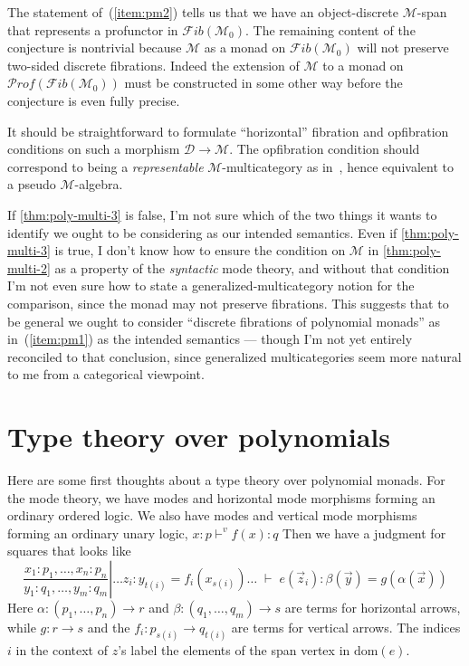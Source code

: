 \documentclass{article}
\theoremstyle{definition}
\def\M{\mathcal{M}}
\def\Fib{\mathcal{F}\mathit{ib}}
\def\Prof{\mathcal{P}\mathit{rof}}
\def\D{\mathcal{D}}
\def\dom{\mathrm{dom}}
\begin{document}
The statement of~(\ref{item:pm2}) tells us that we have an object-discrete $\M$-span that represents a profunctor in $\Fib(\M_0)$.
The remaining content of the conjecture is nontrivial because $\M$ as a monad on $\Fib(\M_0)$ will not preserve two-sided discrete fibrations.
Indeed the extension of $\M$ to a monad on $\Prof(\Fib(\M_0))$ must be constructed in some other way before the conjecture is even fully precise.

It should be straightforward to formulate ``horizontal'' fibration and opfibration conditions on such a morphism $\D\to\M$.
The opfibration condition should correspond to being a \emph{representable} $\M$-multicategory as in~\cite{hermida:coh-univ,hermida:multicats,cs:multicats}, hence equivalent to a pseudo $\M$-algebra.

If \cref{thm:poly-multi-3} is false, I'm not sure which of the two things it wants to identify we ought to be considering as our intended semantics.
Even if \cref{thm:poly-multi-3} is true, I don't know how to ensure the condition on $\M$ in \cref{thm:poly-multi-2} as a property of the \emph{syntactic} mode theory, and without that condition I'm not even sure how to state a generalized-multicategory notion for the comparison, since the monad may not preserve fibrations.
This suggests that to be general we ought to consider ``discrete fibrations of polynomial monads'' as in~(\ref{item:pm1}) as the intended semantics --- though I'm not yet entirely reconciled to that conclusion, since generalized multicategories seem more natural to me from a categorical viewpoint.


\section{Type theory over polynomials}
\label{sec:tt-poly}

Here are some first thoughts about a type theory over polynomial monads.
For the mode theory, we have modes and horizontal mode morphisms forming an ordinary ordered logic.
We also have modes and vertical mode morphisms forming an ordinary unary logic, $x:p \vdash^v f(x):q$
Then we have a judgment for squares that looks like
\[
\left.{\textstyle\frac{x_1:p_1, \dots, x_n:p_n} {y_1:q_1,\dots,y_m:q_m}} \right| \dots z_i:y_{t(i)} = f_i(x_{s(i)}) \dots  \;\vdash\; e(\vec z_i) : {\beta(\vec y)} = g({\alpha(\vec x)})
\]
Here $\alpha : (p_1,\dots,p_n) \to r$ and $\beta: (q_1,\dots,q_m)\to s$ are terms for horizontal arrows, while $g:r\to s$ and the $f_i:p_{s(i)}\to q_{t(i)}$ are terms for vertical arrows.
The indices $i$ in the context of $z$'s label the elements of the span vertex in $\dom(e)$.
\end{document}
